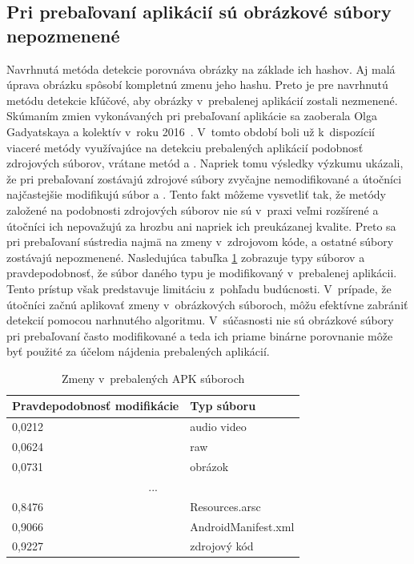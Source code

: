 \subsection*{Pri prebaľovaní aplikácií sú obrázkové súbory nepozmenené}
Navrhnutá metóda detekcie porovnáva obrázky na základe ich hashov. Aj malá úprava obrázku spôsobí kompletnú zmenu jeho hashu. Preto je pre navrhnutú metódu detekcie kľúčové, aby obrázky v~prebalenej aplikácií zostali nezmenené. Skúmaním zmien vykonávaných pri prebaľovaní aplikácie sa zaoberala Olga Gadyatskaya a kolektív v~roku 2016~\cite{Gadyatskaya2016}. V~tomto období boli už k~dispozícií viaceré metódy využívajúce na detekciu prebalených aplikácií podobnosť zdrojových súborov, vrátane metód  a . Napriek tomu výsledky výzkumu ukázali, že pri prebaľovaní zostávajú zdrojové súbory zvyčajne nemodifikované a útočníci najčastejšie modifikujú súbor  a . Tento fakt môžeme vysvetliť tak, že metódy založené na podobnosti zdrojových súborov nie sú v~praxi veľmi rozšírené a útočníci ich nepovažujú za hrozbu ani napriek ich preukázanej kvalite. Preto sa pri prebaľovaní sústredia najmä na zmeny v~zdrojovom kóde, a ostatné súbory zostávajú nepozmenené. Nasledujúca tabuľka \ref{repacakged-changes} zobrazuje typy súborov a pravdepodobnosť, že súbor daného typu je modifikovaný v~prebalenej aplikácii. Tento prístup však predstavuje limitáciu z~pohľadu budúcnosti. V~prípade, že útočníci začnú aplikovať zmeny v~obrázkových súboroch, môžu efektívne zabrániť detekcií pomocou narhnutého algoritmu. V~súčasnosti nie sú obrázkové súbory pri prebaľovaní často modifikované a teda ich priame binárne porovnanie môže byť použité za účelom nájdenia prebalených aplikácií.

\begin{table}[]
\centering
\label{repacakged-changes}
\begin{tabular}{|l|l|}
\hline
\textbf{Pravdepodobnosť modifikácie} & \textbf{Typ súboru}          \\ \hline
0,0212                                      & audio video         \\
0,0624                                      & raw                 \\
0,0731                                      & obrázok             \\
\multicolumn{2}{|c|}{...} \\
0,8476                                      & Resources.arsc      \\
0,9066                                      & AndroidManifest.xml \\
0,9227                                      & zdrojový kód        \\
\hline
\end{tabular}
\caption{Zmeny v~prebalených APK súboroch}
\end{table}


